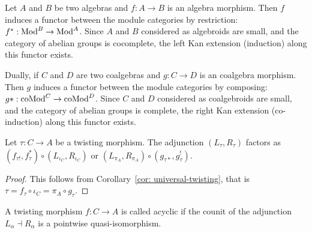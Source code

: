 \documentclass[../thesis.tex]{subfiles}
\begin{document}
            Let $A$ and $B$ be two algebras and $f : A \rightarrow B$ is an algebra morphism. Then $f$ induces a functor between the module categories by restriction: $f^* : \tt{Mod}^B \rightarrow \tt{Mod}^A$. Since $A$ and $B$ considered as algebroids are small, and the category of abelian groups is cocomplete, the left Kan extension (induction) along this functor exists.
            \begin{center}
            \end{center}

            Dually, if $C$ and $D$ are two coalgebras and $g : C \rightarrow D$ is an coalgebra morphism. Then $g$ induces a functor between the module categories by composing: $g* : \tt{coMod}^C \rightarrow \tt{coMod}^D$. Since $C$ and $D$ considered as coalgebroids are small, and the category of abelian groups is complete, the right Kan extension (co-induction) along this functor exists.
            \begin{center}
            \end{center}

            \begin{lemma}\label{lem: twist-fac}
                Let $\tau : C \rightarrow A$ be a twisting morphism. The adjunction $(L_\tau, R_\tau)$ factors as $(f_{\tau !}, f_\tau^*)\circ (L_{\iota_C},R_{\iota_C})$ or $(L_{\pi_A},R_{\pi_A})\circ (g_{\tau *}, g_\tau^!)$.
            \end{lemma}

            \begin{proof}
                This follows from Corollary~\ref{cor: universal-twisting}, that is $\tau = f_\tau \circ \iota_C = \pi_A\circ g_\tau$.
            \end{proof}

            \begin{definition}
                A twisting morphism $f: C \rightarrow A$ is called acyclic if the counit of the adjunction $L_\alpha \dashv R_\alpha$ is a pointwise quasi-isomorphism.
            \end{definition}
\end{document}
